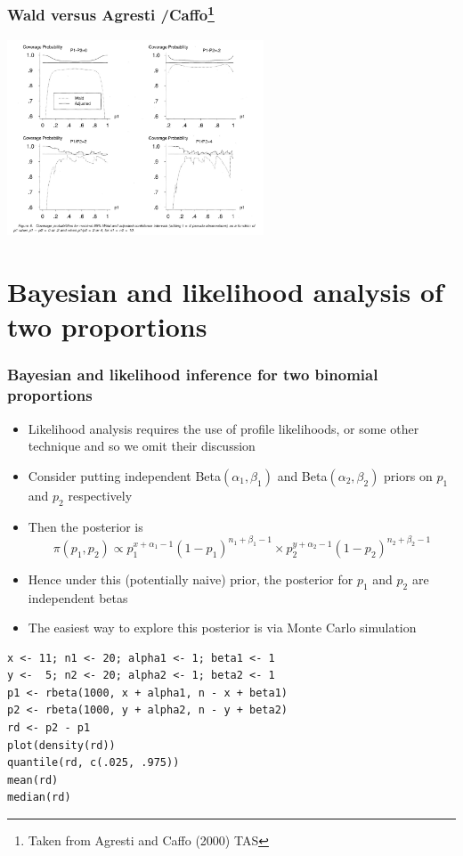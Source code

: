 \documentclass[aspectratio=169]{beamer}
\begin{document}
\begin{frame}\frametitle{Wald versus Agresti /Caffo\footnote{Taken from Agresti and Caffo (2000) TAS }}
\begin{center}
\includegraphics[width=3in]{waldTwoSample.pdf}
\end{center}
\end{frame}

\section{Bayesian and likelihood analysis of two proportions}
\begin{frame}\frametitle{Bayesian and likelihood inference for two binomial proportions}
  \begin{itemize}
  \item Likelihood analysis requires the use of profile likelihoods,
    or some other technique and so we omit their discussion
  \item Consider putting independent Beta$(\alpha_1, \beta_1)$ and Beta$(\alpha_2, \beta_2)$ priors
    on $p_1$ and $p_2$ respectively
  \item Then the posterior is
$$
\pi(p_1, p_2) \propto p_1^{x + \alpha_1 - 1}(1 - p_1)^{n_1 + \beta_1 - 1} \times  p_2^{y+\alpha_2 -1}(1 - p_2)^{n_2+\beta_2-1}
$$
  \item Hence under this (potentially naive) prior, the posterior for $p_1$ and $p_2$ are independent
    betas
  \item The easiest way to explore this posterior is via Monte Carlo simulation
  \end{itemize}
\end{frame}

\begin{frame}[fragile]
\begin{verbatim}
x <- 11; n1 <- 20; alpha1 <- 1; beta1 <- 1
y <-  5; n2 <- 20; alpha2 <- 1; beta2 <- 1
p1 <- rbeta(1000, x + alpha1, n - x + beta1)
p2 <- rbeta(1000, y + alpha2, n - y + beta2)
rd <- p2 - p1
plot(density(rd))
quantile(rd, c(.025, .975))
mean(rd)
median(rd)
\end{verbatim}
\end{frame}
\end{document}
